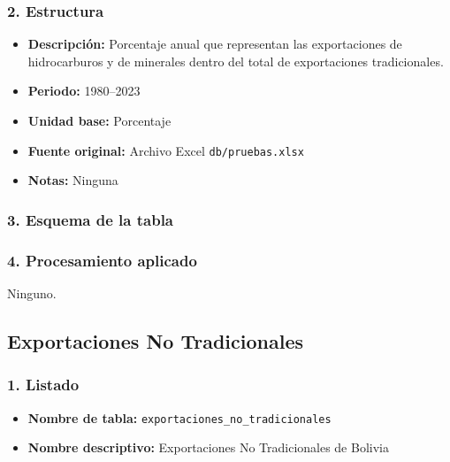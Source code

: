 \documentclass[12pt,a4paper]{article}
\begin{document}
\subsubsection*{2. Estructura}
\begin{itemize}
  \item \textbf{Descripción:} Porcentaje anual que representan las exportaciones de hidrocarburos y de minerales dentro del total de exportaciones tradicionales.
  \item \textbf{Periodo:} 1980--2023
  \item \textbf{Unidad base:} Porcentaje
  \item \textbf{Fuente original:} Archivo Excel \texttt{db/pruebas.xlsx}
  \item \textbf{Notas:} Ninguna
\end{itemize}

\subsubsection*{3. Esquema de la tabla}

\subsubsection*{4. Procesamiento aplicado}
Ninguno.

\subsection{Exportaciones No Tradicionales}

\subsubsection*{1. Listado}
\begin{itemize}
  \item \textbf{Nombre de tabla:} \texttt{exportaciones\_no\_tradicionales}
  \item \textbf{Nombre descriptivo:} Exportaciones No Tradicionales de Bolivia
\end{itemize}
\end{document}
